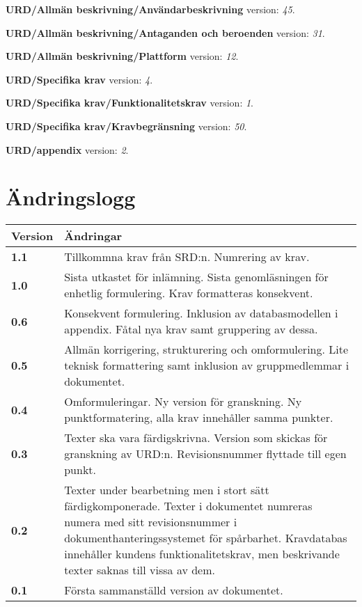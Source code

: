 \documentclass[a4paper, twoside, 11pt, titlepage]{article}
\begin{document}
\textbf{URD/Allmän beskrivning/Användarbeskrivning} version: \emph{45}.

\textbf{URD/Allmän beskrivning/Antaganden och beroenden} version: \emph{31}.

\textbf{URD/Allmän beskrivning/Plattform} version: \emph{12}.

\textbf{URD/Specifika krav} version: \emph{4}.

\textbf{URD/Specifika krav/Funktionalitetskrav} version: \emph{1}.

\textbf{URD/Specifika krav/Kravbegränsning} version: \emph{50}.

\textbf{URD/appendix} version: \emph{2}.

\clearpage
\section*{Ändringslogg}


\begin{tabular} { p{2.6cm} p{12.5cm} }
	\hline
	\sffamily\textbf{Version} & \sffamily\textbf{Ändringar } \\
	\hline
	\sffamily\textbf{1.1} & Tillkommna krav från SRD:n. Numrering av krav.  \\
	\hline
	\sffamily\textbf{1.0} & Sista utkastet för inlämning. Sista genomläsningen för enhetlig formulering. Krav formatteras konsekvent.  \\
	\hline
	\sffamily\textbf{0.6} & Konsekvent formulering. Inklusion av databasmodellen i appendix. Fåtal nya krav samt gruppering av dessa.  \\
	\hline
	\sffamily\textbf{0.5} & Allmän korrigering, strukturering och omformulering. Lite teknisk formattering samt inklusion av gruppmedlemmar i dokumentet.  \\
	\hline
	\sffamily\textbf{0.4} & Omformuleringar. Ny version för granskning. Ny punktformatering, alla krav innehåller samma punkter.  \\
	\hline
	\sffamily\textbf{0.3} & Texter ska vara färdigskrivna. Version som skickas för granskning av URD:n. Revisionsnummer flyttade till egen punkt.  \\
	\hline
	\sffamily\textbf{0.2} & Texter under bearbetning men i stort sätt färdigkomponerade. Texter i dokumentet numreras numera med sitt revisionsnummer i dokumenthanteringssystemet för spårbarhet. Kravdatabas innehåller kundens funktionalitetskrav, men beskrivande texter saknas till vissa av dem.  \\
	\hline
	\sffamily\textbf{0.1} & Första sammanställd version av dokumentet.  \\
	\hline
\end{tabular}
\end{document}
